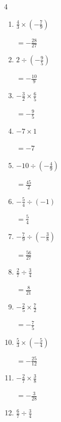 \begin{multicols}{4}
\begin{enumerate}
        $\displaystyle =-27$

  \item $\displaystyle \frac{4}{3}\times{}\left(-\frac{7}{9}\right)$

        $\displaystyle =-\frac{28}{27}$

  \item $\displaystyle 2\div{}\left(-\frac{9}{5}\right)$

        $\displaystyle =-\frac{10}{9}$

  \item $\displaystyle -\frac{3}{2}\times{}\frac{6}{5}$

        $\displaystyle =-\frac{9}{5}$

  \item $\displaystyle -7\times{}1$

        $\displaystyle =-7$

  \item $\displaystyle -10\div{}\left(-\frac{4}{9}\right)$

        $\displaystyle =\frac{45}{2}$

  \item $\displaystyle -\frac{5}{4}\div{}\left(-1\right)$

        $\displaystyle =\frac{5}{4}$

\columnbreak %

  \item $\displaystyle -\frac{7}{9}\div{}\left(-\frac{3}{8}\right)$

        $\displaystyle =\frac{56}{27}$

  \item $\displaystyle \frac{2}{7}\div{}\frac{3}{4}$

        $\displaystyle =\frac{8}{21}$

  \item $\displaystyle -\frac{2}{5}\times{}\frac{7}{2}$

        $\displaystyle =-\frac{7}{5}$

  \item $\displaystyle \frac{5}{3}\times{}\left(-\frac{5}{4}\right)$

        $\displaystyle =-\frac{25}{12}$

  \item $\displaystyle -\frac{2}{7}\times{}\frac{3}{8}$

        $\displaystyle =-\frac{3}{28}$

  \item $\displaystyle \frac{6}{7}\div{}\frac{3}{4}$


\end{enumerate}
\end{multicols}
